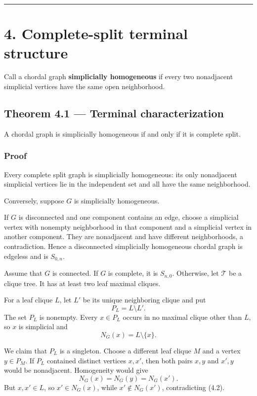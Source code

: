 \documentclass[11pt,a4paper]{article}
\begin{document}
\begin{center}\rule{0.5\linewidth}{0.5pt}\end{center}

\section{4. Complete-split terminal structure}\label{complete-split-terminal-structure}

Call a chordal graph \textbf{simplicially homogeneous} if every two nonadjacent
simplicial vertices have the same open neighborhood.

\subsection{Theorem 4.1 --- Terminal characterization}\label{theorem-4.1-terminal-characterization}

A chordal graph is simplicially homogeneous if and only if it is complete
split.

\subsubsection{Proof}\label{proof-3}

Every complete split graph is simplicially homogeneous: its only
nonadjacent simplicial vertices lie in the independent set and all have the
same neighborhood.

Conversely, suppose \(G\) is simplicially homogeneous.

If \(G\) is disconnected and one component contains an edge, choose a
simplicial vertex with nonempty neighborhood in that component and a
simplicial vertex in another component. They are nonadjacent and have
different neighborhoods, a contradiction. Hence a disconnected
simplicially homogeneous chordal graph is edgeless and is \(S_{0,n}\).

Assume that \(G\) is connected. If \(G\) is complete, it is \(S_{n,0}\).
Otherwise, let \(\mathcal T\) be a clique tree. It has at least two leaf
maximal cliques.

For a leaf clique \(L\), let \(L'\) be its unique neighboring clique and put
\[
P_L=L\setminus L'.
\]
The set \(P_L\) is nonempty. Every \(x\in P_L\) occurs in no maximal clique
other than \(L\), so \(x\) is simplicial and
\[
N_G(x)=L\setminus\{x\}.
\tag{4.1}
\]

We claim that \(P_L\) is a singleton. Choose a different leaf clique \(M\)
and a vertex \(y\in P_M\). If \(P_L\) contained distinct vertices \(x,x'\),
then both pairs \(x,y\) and \(x',y\) would be nonadjacent. Homogeneity would
give
\[
N_G(x)=N_G(y)=N_G(x').
\tag{4.2}
\]
But \(x,x'\in L\), so \(x'\in N_G(x)\), while
\(x'\notin N_G(x')\), contradicting (4.2).
\end{document}
